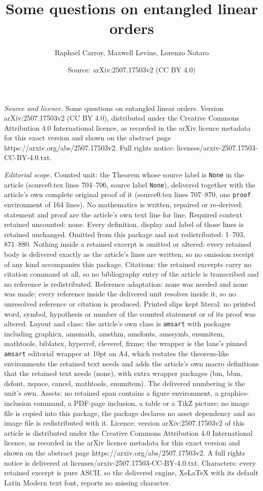 \documentclass[10pt,a4paper]{amsart}
\title[Some questions on entangled linear orders]{Some questions on entangled linear orders}
\author{Rapha\"el Carroy, Maxwell Levine, Lorenzo Notaro}
\date{Source: arXiv:2507.17503v2 (CC BY 4.0)}
\begin{document}
\maketitle

\noindent\emph{Source and licence.} Some questions on entangled linear orders. Version arXiv:2507.17503v2 (CC BY 4.0), distributed under the Creative Commons Attribution 4.0 International licence, as recorded in the arXiv licence metadata for this exact version and shown on the abstract page https://arxiv.org/abs/2507.17503v2. Full rights notice: licenses/arxiv-2507.17503-CC-BY-4.0.txt.\par\smallskip

\noindent\textit{Editorial scope.} Counted unit: the Theorem whose source label is \texttt{None} in the article (source0.tex lines 704--706, source label \texttt{None}), delivered together with the article's own complete original proof of it (source0.tex lines 707--870, one \texttt{proof} environment of 164 lines). No mathematics is written, repaired or re-derived: statement and proof are the article's own text line for line. Required context retained uncounted: none. Every definition, display and label of those lines is retained unchanged. Omitted from this package and not redistributed: 1--703, 871--880. Nothing inside a retained excerpt is omitted or altered: every retained body is delivered exactly as the article's lines are written, so no omission receipt of any kind accompanies this package. Citations: the retained excerpts carry no citation command at all, so no bibliography entry of the article is transcribed and no reference is redistributed. Reference adaptation: none was needed and none was made; every reference inside the delivered unit resolves inside it, so no unresolved reference or citation is produced. Printed slips kept literal: no printed word, symbol, hypothesis or number of the counted statement or of its proof was altered. Layout and class: the article's own class is \texttt{amsart} with packages including graphicx, amsmath, amsthm, amsfonts, amssymb, enumitem, mathtools, biblatex, hyperref, cleveref, fixme; the wrapper is the lane's pinned \texttt{amsart} editorial wrapper at 10pt on A4, which restates the theorem-like environments the retained text needs and adds the article's own macro definitions that the retained text needs (none), with extra wrapper packages (bm, bbm, dsfont, xspace, cancel, mathtools, enumitem). The delivered numbering is the unit's own. Assets: no retained span contains a figure environment, a graphics-inclusion command, a PDF-page inclusion, a table or a TikZ picture; no image file is copied into this package, the package declares no asset dependency and no image file is redistributed with it. Licence: version arXiv:2507.17503v2 of this article is distributed under the Creative Commons Attribution 4.0 International licence, as recorded in the arXiv licence metadata for this exact version and shown on the abstract page https://arxiv.org/abs/2507.17503v2. A full rights notice is delivered at licenses/arxiv-2507.17503-CC-BY-4.0.txt. Characters: every retained excerpt is pure ASCII, so the delivered engine, XeLaTeX with its default Latin Modern text font, reports no missing character.
\end{document}
